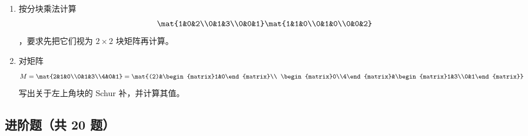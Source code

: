 \begin{enumerate}[label=\arabic*.]
  \item \basic 按分块乘法计算
  \[
  \mat{1&0&2\\0&1&3\\0&0&1}
  \mat{1&1&0\\0&1&0\\0&0&2}
  \]
  ，要求先把它们视为 $2\times2$ 块矩阵再计算。

  \item \basic 对矩阵
  \[
  M=\mat{2&1&0\\0&1&3\\4&0&1}
  =\mat{(2)&\begin{matrix}1&0\end{matrix}\\
  \begin{matrix}0\\4\end{matrix}&\begin{matrix}1&3\\0&1\end{matrix}}
  \]
  写出关于左上角块的 Schur 补，并计算其值。
\end{enumerate}

\subsection*{进阶题（共 20 题）}

